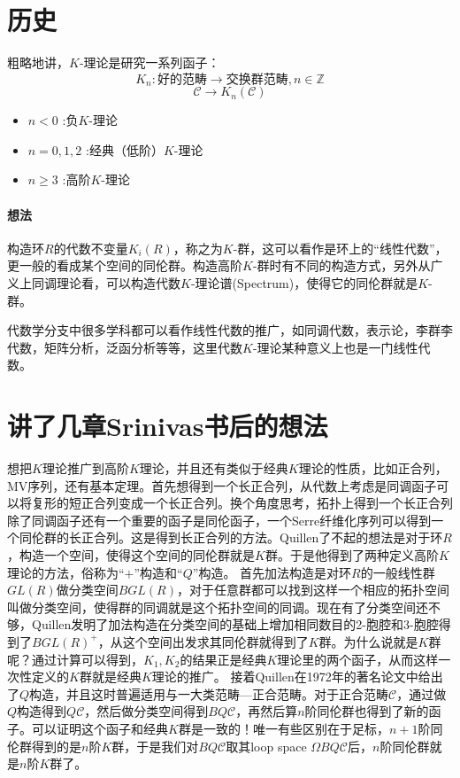 \section{历史}
粗略地讲，$K$-理论是研究一系列函子：
\[K_n: \text{好的范畴} \longrightarrow \text{交换群范畴},n\in \mathbb{Z}\]
\[\mathcal{C}\longrightarrow K_n(\mathcal{C})\]
\begin{itemize}
	\item  $n<0$  :负$K$-理论
	\item  $n=0,1,2$ :经典（低阶）$K$-理论
	\item  $n\geq 3$ :高阶$K$-理论
\end{itemize}
\paragraph{想法}
构造环$R$的代数不变量$K_i(R)$，称之为$K$-群，这可以看作是环上的“线性代数”，更一般的看成某个空间的同伦群。构造高阶$K$-群时有不同的构造方式，另外从广义上同调理论看，可以构造代数$K$-理论谱(Spectrum)，使得它的同伦群就是$K$-群。

代数学分支中很多学科都可以看作线性代数的推广，如同调代数，表示论，李群李代数，矩阵分析，泛函分析等等，这里代数$K$-理论某种意义上也是一门线性代数。




\section{讲了几章Srinivas书后的想法}
想把$K$理论推广到高阶$K$理论，并且还有类似于经典$K$理论的性质，比如正合列，MV序列，还有基本定理。首先想得到一个长正合列，从代数上考虑是同调函子可以将复形的短正合列变成一个长正合列。换个角度思考，拓扑上得到一个长正合列除了同调函子还有一个重要的函子是同伦函子，一个Serre纤维化序列可以得到一个同伦群的长正合列。这是得到长正合列的方法。Quillen了不起的想法是对于环$R$，构造一个空间，使得这个空间的同伦群就是$K$群。于是他得到了两种定义高阶$K$理论的方法，俗称为“$+$”构造和“$Q$”构造。
首先加法构造是对环$R$的一般线性群$GL(R)$做分类空间$BGL(R)$，对于任意群都可以找到这样一个相应的拓扑空间叫做分类空间，使得群的同调就是这个拓扑空间的同调。现在有了分类空间还不够，Quillen发明了加法构造在分类空间的基础上增加相同数目的2-胞腔和3-胞腔得到了$BGL(R)^+$，从这个空间出发求其同伦群就得到了$K$群。为什么说就是$K$群呢？通过计算可以得到，$K_1,K_2$的结果正是经典$K$理论里的两个函子，从而这样一次性定义的$K$群就是经典$K$理论的推广。
接着Quillen在1972年的著名论文中给出了$Q$构造，并且这时普遍适用与一大类范畴---正合范畴。对于正合范畴$\mathcal{C}$，通过做$Q$构造得到$Q\mathcal{C}$，然后做分类空间得到$BQ\mathcal{C}$，再然后算$n$阶同伦群也得到了新的函子。可以证明这个函子和经典$K$群是一致的！唯一有些区别在于足标，$n+1$阶同伦群得到的是$n$阶$K$群，于是我们对$BQ\mathcal{C}$取其loop space $\Omega BQ\mathcal{C}$后，$n$阶同伦群就是$n$阶$K$群了。

